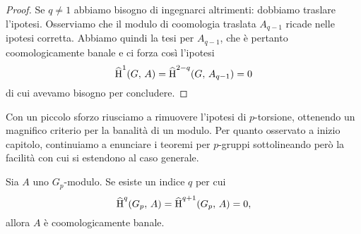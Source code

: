 \begin{proof}
	Se $ q \neq 1 $ abbiamo bisogno di ingegnarci altrimenti: dobbiamo traslare l'ipotesi. Osserviamo che il modulo di coomologia traslata $ A_{q-1} $ ricade nelle ipotesi corretta. Abbiamo quindi la tesi per $ A_{q-1} $, che è pertanto coomologicamente banale e ci forza così l'ipotesi 
	\[ \operatorname{\widehat{H}}^1(G, \, A) = \operatorname{\widehat{H}}^{2-q}(G, \, A_{q-1}) = 0 \]
	di cui avevamo bisogno per concludere.
\end{proof}

Con un piccolo sforzo riusciamo a rimuovere l'ipotesi di $ p $-torsione, ottenendo un magnifico criterio per la banalità di un modulo. Per quanto osservato a inizio capitolo, continuiamo a enunciare i teoremi per $ p $-gruppi sottolineando però la facilità con cui si estendono al caso generale.

\begin{theorem}
	Sia $ A $ uno $ G_p $-modulo. Se esiste un indice $ q $ per cui
	\[ \operatorname{\widehat{H}}^q(G_p, \, A) = \operatorname{\widehat{H}}^{q+1}(G_p, \, A) = 0, \]
	allora $ A $ è coomologicamente banale.
\end{theorem}

